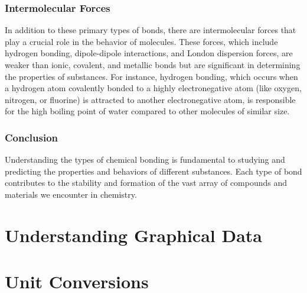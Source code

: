 \documentclass[10pt, roman]{article}
\begin{document}
\subsubsection*{Intermolecular Forces}

In addition to these primary types of bonds, there are intermolecular forces that play a crucial role in the behavior of molecules.
These forces, which include hydrogen bonding, dipole-dipole interactions, and London dispersion forces, are weaker than ionic, covalent, and metallic bonds but are significant in determining the properties of substances.
For instance, hydrogen bonding, which occurs when a hydrogen atom covalently bonded to a highly electronegative atom (like oxygen, nitrogen, or fluorine) is attracted to another electronegative atom, is responsible for the high boiling point of water compared to other molecules of similar size.

\subsubsection*{Conclusion}

Understanding the types of chemical bonding is fundamental to studying and predicting the properties and behaviors of different substances.
Each type of bond contributes to the stability and formation of the vast array of compounds and materials we encounter in chemistry.

\section{Understanding Graphical Data}
\section{Unit Conversions}
\end{document}
